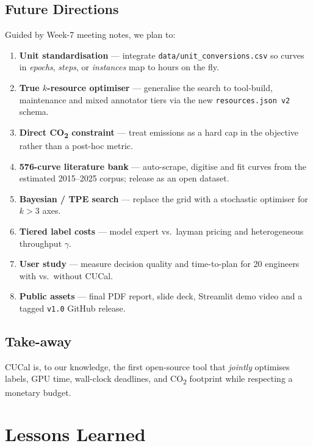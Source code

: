 \documentclass[11pt]{article}
\begin{document}
\subsection{Future Directions}
Guided by Week-7 meeting notes, we plan to:
\begin{enumerate}
  \item \textbf{Unit standardisation} — integrate
        \texttt{data/unit\_conversions.csv} so curves in \emph{epochs},
        \emph{steps}, or \emph{instances} map to hours on the fly.
  \item \textbf{True \(k\)-resource optimiser} — generalise the search to
        tool-build, maintenance and mixed annotator tiers via the new
        \texttt{resources.json\,v2} schema.
  \item \textbf{Direct CO\textsubscript{2} constraint} — treat emissions as
        a hard cap in the objective rather than a post-hoc metric.
  \item \textbf{576-curve literature bank} — auto-scrape, digitise and fit
        curves from the estimated 2015–2025 corpus; release as an open
        dataset.
  \item \textbf{Bayesian / TPE search} — replace the grid with a
        stochastic optimiser for \(k\!>\!3\) axes.
  \item \textbf{Tiered label costs} — model expert vs.\ layman pricing and
        heterogeneous throughput $\gamma$.
  \item \textbf{User study} — measure decision quality and time-to-plan for
        20 engineers with vs.\ without CUCal.
  \item \textbf{Public assets} — final PDF report, slide deck, Streamlit
        demo video and a tagged \texttt{v1.0} GitHub release.
\end{enumerate}

\subsection{Take-away}

CUCal is, to our knowledge, the first open-source tool that
\emph{jointly} optimises labels, GPU time, wall-clock deadlines, and
CO\textsubscript{2} footprint while respecting a monetary budget.

\section{Lessons Learned}
\end{document}
